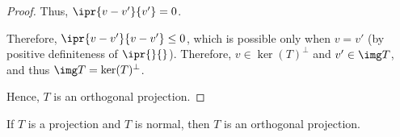 \documentclass[11pt]{scrartcl}
\begin{document}
\begin{proof}
  Thus, $\ipr{v-v'}{v'}=0$.

  Therefore, $\ipr{v-v'}{v-v'}\leq 0$, which is possible only when
  $v=v'$ (by positive definiteness of $\ipr{\*}{\*}$). Therefore,
  $v\in \ker(T)^{\bot}$ and $v'\in\img T$, and thus
  $\img T = \ker (T)^{\bot}$.

  Hence, $T$ is an orthogonal projection.
\end{proof}

\begin{lemma}
  If $T$ is a projection and $T$ is normal, then $T$ is an orthogonal projection.
\end{lemma}
\end{document}
